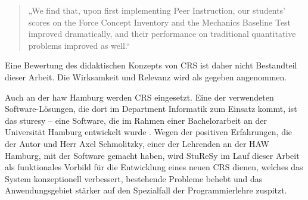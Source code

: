 \begin{quote}
„We find that, upon first implementing Peer Instruction, our students’ scores on the Force Concept Inventory and the Mechanics Baseline Test improved dramatically, and their performance on traditional quantitative problems improved as well.“
\end{quote}


Eine Bewertung des didaktischen Konzepts von CRS ist daher nicht Bestandteil dieser Arbeit. Die Wirksamkeit und Relevanz wird als gegeben angenommen.

Auch an der \ac{haw} Hamburg werden CRS eingesetzt. Eine der verwendeten Software-Lösungen, die dort im Department Informatik zum Einsatz kommt, ist das \ac{sturesy} – eine Software, die im Rahmen einer Bachelorarbeit an der Universität Hamburg entwickelt wurde \cite{sturesy}. Wegen der positiven Erfahrungen, die der Autor und Herr Axel Schmolitzky, einer der Lehrenden an der HAW Hamburg, mit der Software gemacht haben, wird StuReSy im Lauf dieser Arbeit als funktionales Vorbild für die Entwicklung eines neuen CRS dienen, welches das System konzeptionell verbessert, bestehende Probleme behebt und das Anwendungsgebiet stärker auf den Spezialfall der Programmierlehre zuspitzt.